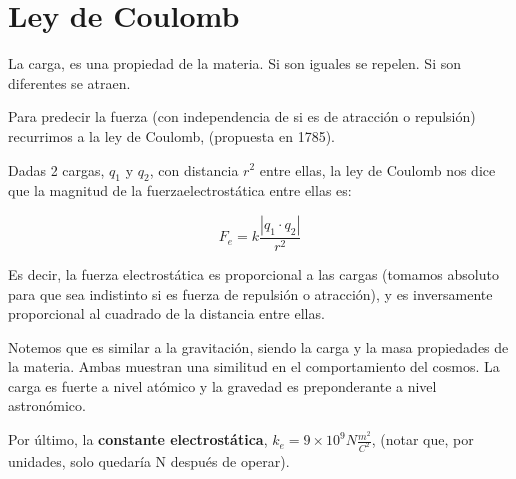 \section{Ley de Coulomb}

La carga,
es una propiedad de la materia.
Si son iguales se repelen.
Si son diferentes se atraen.

Para predecir la fuerza 
(con independencia de si es de atracción o repulsión) 
recurrimos a la ley de Coulomb,
(propuesta en 1785).

Dadas 2 cargas,
\(q_1\) y \(q_2\),
con distancia \(r^{2}\) entre ellas,
la ley de Coulomb nos dice que la magnitud de la fuerzaelectrostática entre ellas es:

\vspace{.3cm}
\begin{equation}
    F_e = k\frac{|q_1\cdot q_2|}{r^{2}}
\end{equation}
\vspace{.3cm}

Es decir,
la fuerza electrostática es proporcional a las cargas
(tomamos absoluto para que sea indistinto si es fuerza de repulsión o atracción),
y es inversamente proporcional al cuadrado de la distancia entre ellas.

Notemos que es similar a la gravitación,
siendo la carga y la masa propiedades de la materia.
Ambas muestran una similitud en el comportamiento del cosmos.
La carga es fuerte a nivel atómico y la gravedad es preponderante a nivel astronómico.

Por último,
la \textbf{constante electrostática},
\(k_e = 9 \times 10^{9} N \frac{m^{2}}{C^{2}}\),
(notar que, por unidades, solo quedaría N después de operar).
